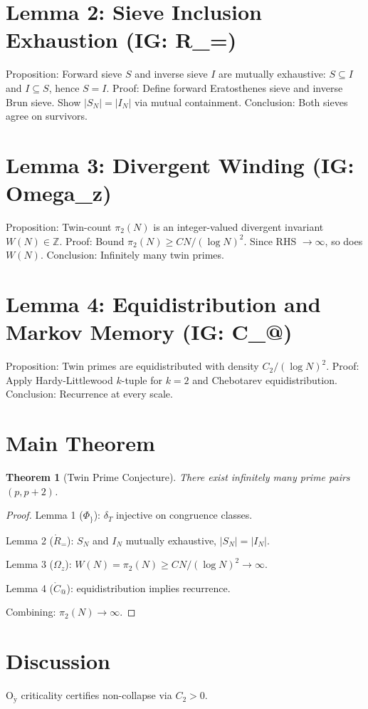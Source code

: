 \documentclass[11pt]{article}
\theoremstyle{plain}
\newtheorem{theorem}{Theorem}
\begin{document}
\section{Lemma 2: Sieve Inclusion Exhaustion (IG: R_=)}

Proposition: Forward sieve $S$ and inverse sieve $I$ are mutually exhaustive: $S \subseteq I$ and $I \subseteq S$, hence $S = I$.
Proof: Define forward Eratosthenes sieve and inverse Brun sieve. Show $|S_N| = |I_N|$ via mutual containment.
Conclusion: Both sieves agree on survivors.




\section{Lemma 3: Divergent Winding (IG: Omega_z)}

Proposition: Twin-count $\pi_2(N)$ is an integer-valued divergent invariant $W(N) \in \mathbb{Z}$.
Proof: Bound $\pi_2(N) \geq C N/(\log N)^2$. Since RHS $\to \infty$, so does $W(N)$.
Conclusion: Infinitely many twin primes.




\section{Lemma 4: Equidistribution and Markov Memory (IG: C_@)}

Proposition: Twin primes are equidistributed with density $C_2/(\log N)^2$.
Proof: Apply Hardy-Littlewood $k$-tuple for $k=2$ and Chebotarev equidistribution.
Conclusion: Recurrence at every scale.




\section{Main Theorem}

\begin{theorem}[Twin Prime Conjecture]

There exist infinitely many prime pairs $(p,p+2)$.

\end{theorem}

\begin{proof}

Lemma 1 ($\Phi_{\}}$): $\delta_T$ injective on congruence classes.

Lemma 2 ($\mathring{R}_{=}$): $S_N$ and $I_N$ mutually exhaustive, $|S_N|=|I_N|$.

Lemma 3 ($\Omega_z$): $W(N)=\pi_2(N) \ge C N/(\log N)^2 \to \infty$.

Lemma 4 ($\mathring{C}_{@}$): equidistribution implies recurrence.

Combining: $\pi_2(N)\to\infty$. \qedhere

\end{proof}

\section{Discussion}

$\mathrm{O}_{\mathrm{\ddot{y}}}$ criticality certifies non-collapse via $C_2>0$.
\end{document}
